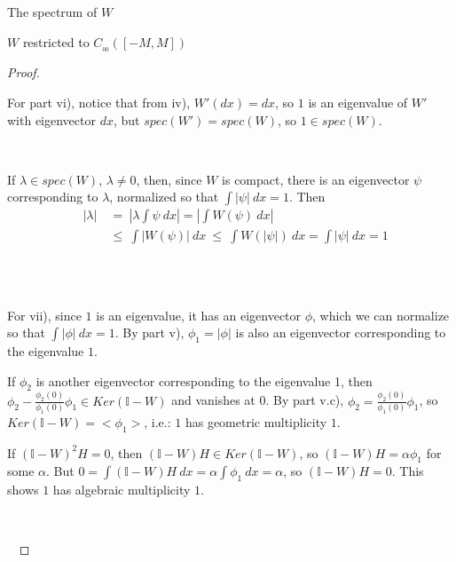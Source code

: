 \documentclass[12pt]{article}
\begin{document}
\begin{section}{The spectrum of $W$ }
\begin{subsection}{$W$ restricted to $C_{_{0\!0}}([-M,M])$}
\begin{proof}
\  

For part vi), notice that from iv), $W'(dx)=dx$, so $1$ is an eigenvalue of $W'$ with eigenvector $dx$, but $spec(W')=spec(W)$, so $1 \in spec(W)$. 
\  

\ 


If $\lambda \in spec(W)$, $\lambda \ne 0$, then, since $W$ is compact, there is an eigenvector $\psi$ corresponding to $\lambda$, normalized so that $\int |\psi| \ dx = 1$. Then
\begin{align*}
&& |\lambda| &~=~ \left| \lambda \int \psi \ dx \right| = \left| \int W(\psi) \ dx \right| &\\
&& &~\le~  \int \left| W(\psi) \right| \ dx  ~\le~ \int W(|\psi|) \ dx = \int |\psi| \ dx = 1 &
\end{align*}
\

\

For vii), since $1$ is an eigenvalue, it has an eigenvector $\phi$, which we can normalize so that $\int |\phi| \ dx = 1$. By part v), $\phi_1 = |\phi|$ is also an eigenvector corresponding to the eigenvalue $1$.

If $\phi_2$ is another eigenvector corresponding to the eigenvalue 1, then $\phi_2 - \frac{\phi_2(0)}{\phi_1(0)} \phi_1 \in Ker(\mathbb{I} - W)$ and vanishes at 0. By part v.c), $\phi_2 = \frac{\phi_2(0)}{\phi_1(0)} \phi_1$, so $Ker(\mathbb{I} - W) = <\phi_1>$, i.e.: $1$ has geometric multiplicity $1$. 

If $(\mathbb{I} - W)^2 H = 0$, then $(\mathbb{I} - W) H \in Ker(\mathbb{I} - W)$, so $(\mathbb{I} - W) H = \alpha \phi_1$ for some $\alpha$. But $0 = \int (\mathbb{I} - W) H \ dx = \alpha \int \phi_1 \ dx = \alpha $, so $(\mathbb{I} - W) H = 0$. This shows $1$ has algebraic multiplicity $1$.

\

\


\end{proof}
\end{subsection}
\end{section}
\end{document}
